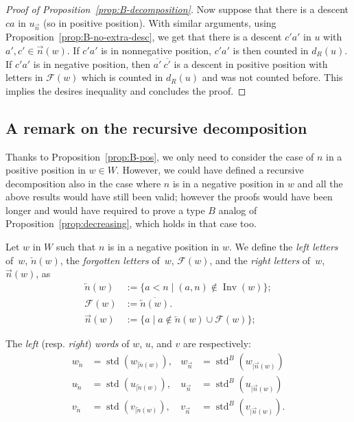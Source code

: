 \documentclass[ALCO,Unicode]{cedram}
\theoremstyle{definition}
\DeclareMathOperator{\std}{std}
\newcommand{\rest}[2]{#1_{|#2}}
\newcommand{\srest}[2]{\std(#1_{|#2})}
\DeclareMathOperator{\invs}{Inv}
\newcommand{\R}{{\overrightarrow{n}}}
\newcommand{\LL}{{\overleftarrow{n}}}
\newcommand{\dd}{d_R}
\newcommand{\Bstd}{\std^{B}}
\newcommand{\Bsrest}[2]{\Bstd(\rest{#1}{#2})}
\newcommand{\F}{\mathcal{F}}
\begin{document}
\begin{proof}[Proof of Proposition~\ref{prop:B-decomposition}]
Now suppose that there is a descent $ca$ in $u_\R$ (so in positive position). With similar arguments, using Proposition~\ref{prop:B-no-extra-desc}, we get that there is a descent $c'a'$ in $u$ with $a',c' \in \R(w)$. If $c'a'$ is in nonnegative position,  $c'a'$ is then counted in $\dd(u)$. If $c'a'$ is in negative position, then $\overline{a'}~\overline{c'}$ is a descent in positive position with letters in $\F(w)$ which is counted in $\dd(u)$ and was not counted before. This implies the desires inequality and concludes the proof.
\end{proof}


\subsection{A remark on the recursive decomposition}

Thanks to Proposition~\ref{prop:B-pos}, we only need to consider the case of $n$ in a positive position in $w\in W$. However, we could have defined a recursive decomposition also in the case where $n$ is in a negative position in $w$ and all the above results would have still been valid; however the proofs would have been longer and would have required to prove a type $B$ analog of Proposition~\ref{prop:decreasing}, which holds in that case too.

\begin{defi} Let $w$ in $W$ such that $n$ is in a negative position in $w$. We define the \emph{left letters} of~$w$, $\LL(w)$, the \emph{forgotten letters} of~$w$, $\F(w)$, and the \emph{right letters} of~$w$, $\R(w)$,  as
\begin{align*}
\LL(w) &:= \lbrace a < n \mid (a,n) \not\in \invs(w) \rbrace; \\
\F(w) &:= \overline{\LL(w)}. \\
\R(w) &:= \lbrace a \mid a \not\in \LL(w) \cup \F(w) \rbrace;
\end{align*}

The {\em left} (resp. {\em right}) {\em words} of $w$, $u$, and $v$ are respectively:
\begin{align*}
w_\LL &= \srest{w}{\LL(w)}, & w_\R &= \Bsrest{w}{\R(w)} \\
u_\LL &= \srest{u}{\LL(w)}, & u_\R &= \Bsrest{u}{\R(w)} \\
v_\LL &= \srest{v}{\LL(w)}, & v_\R &= \Bsrest{v}{\R(w)}. 
\end{align*}
\end{defi}
\end{document}
